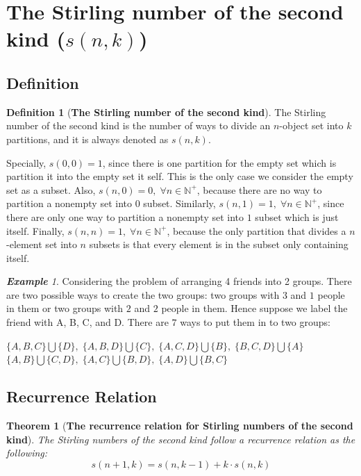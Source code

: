 \documentclass{article}
\newtheorem{theorem}{Theorem}[section]
\theoremstyle{definition}
\newtheorem{definition}{Definition}[section]
\theoremstyle{remark}
\theoremstyle{example}
\newtheorem{example}{\textbf{Example}}[section]
\begin{document}
\section{The Stirling number of the second kind ($s(n,k)$)}
\subsection{Definition}

\begin{definition}[\textbf{The Stirling number of the second kind}]\label{def:SN2nd}
    The Stirling number of the second kind is the number of ways to divide an $n$-object set into $k$ partitions, and it is always denoted as $s(n,k)$.
\end{definition}

Specially, $s(0,0) = 1$, since there is one partition for the empty set which is partition it into the empty set it self. This is the only case we consider the empty set as a subset. Also, $s(n,0) = 0, \; \forall n \in \mathbb{N^{+}}$, because there are no way to partition a nonempty set into $0$ subset. Similarly, $s(n,1) = 1, \; \forall n \in \mathbb{N^{+}}$, since there are only one way to partition a nonempty set into $1$ subset which is just itself. Finally, $s(n,n) = 1, \; \forall n \in \mathbb{N^{+}}$, because the only partition that divides a $n$-element set into $n$ subsets is that every element is in the subset only containing itself.

\begin{example}
    Considering the problem of arranging 4 friends into 2 groups. There are two possible ways to create the two groups: two groups with $3$ and $1$ people in them or two groups with $2$ and $2$ people in them. Hence suppose we label the friend with A, B, C, and D. There are $7$ ways to put them in to two groups:
        \begin{center}
        $\{A,B,C\}\bigcup \{D\},\; \{A,B,D\}\bigcup\{C\},\; \{A,C,D\}\bigcup\{B\},\; \{B,C,D\}\bigcup\{A\}$\\
        $\{A,B\}\bigcup\{C,D\},\; \{A,C\}\bigcup\{B,D\},\;\{A,D\}\bigcup\{B,C\}$
        \end{center}
\end{example}

\subsection{Recurrence Relation}
\begin{theorem}[\textbf{The recurrence relation for Stirling numbers of the second kind}]\label{thm:RR2nd}
    The Stirling numbers of the second kind follow a recurrence relation as the following:
    \begin{equation}\label{eqn:RR2nd}
        s(n+1,k) = s(n,k-1) + k\cdot s(n,k)
    \end{equation}
\end{theorem}
\end{document}
